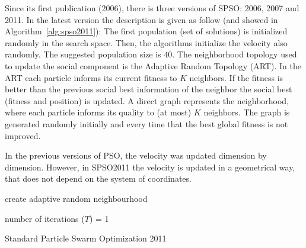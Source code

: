 \documentclass{article}
\begin{document}
    Since its first publication (2006), there is three versions of SPSO: 2006, 2007 and 2011.
    In the latest version the description is given as follow (and showed in Algorithm~\ref{alg:spso2011}):
    The first population (set of solutions) is initialized randomly in the search space. Then, the algorithms initialize the velocity also randomly. The suggested population size is $40$. The neighborhood topology used to update the social component is the Adaptive Random Topology (ART).
    In the ART each particle informs its current fitness to $K$ neighbors. If the fitness is better than the previous social best information of the neighbor the social best (fitness and position) is updated. A direct graph represents the neighborhood, where each particle informs its quality to (at most) $K$ neighbors. The graph is generated randomly initially and every time that the best global fitness is not improved.

    In the previous versions of PSO, the velocity was updated dimension by dimension.
    However, in SPSO2011 the velocity is updated in a geometrical way,  that does not depend on the system of coordinates.

    \begin{algorithm}[!htb]
        
        create adaptive random neighbourhood\;

        number of iterations ($T$) = 1\;
        
        \caption{Standard Particle Swarm Optimization 2011}
        \label{alg:spso2011}
    \end{algorithm}
\end{document}
